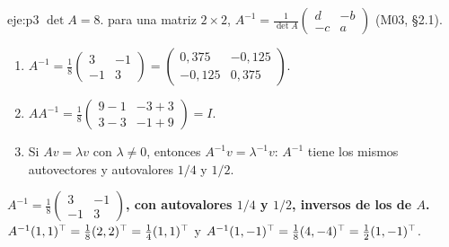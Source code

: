 \begin{solucion}{eje:p3}
\datos $\det A=8$.
\planteamiento para una matriz $2\times2$, $A^{-1}=\frac1{\det A}\begin{pmatrix}d&-b\\-c&a\end{pmatrix}$ (M03, §2.1).
\pasos
\begin{enumerate}[label=\arabic*.]
  \item $A^{-1}=\frac18\begin{pmatrix}3&-1\\-1&3\end{pmatrix}=\begin{pmatrix}0{,}375&-0{,}125\\-0{,}125&0{,}375\end{pmatrix}$.
  \item $AA^{-1}=\frac18\begin{pmatrix}9-1&-3+3\\3-3&-1+9\end{pmatrix}=I$.
  \item Si $Av=\lambda v$ con $\lambda\neq0$, entonces $A^{-1}v=\lambda^{-1}v$: $A^{-1}$ tiene los mismos autovectores y autovalores $1/4$ y $1/2$.
\end{enumerate}
\resultado \textbf{$A^{-1}=\frac18\begin{pmatrix}3&-1\\-1&3\end{pmatrix}$, con autovalores $1/4$ y $1/2$, inversos de los de $A$.}
\comprobacion $A^{-1}(1,1)^{\top}=\tfrac18(2,2)^{\top}=\tfrac14(1,1)^{\top}$ y $A^{-1}(1,-1)^{\top}=\tfrac18(4,-4)^{\top}=\tfrac12(1,-1)^{\top}$.


\end{solucion}
